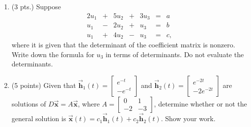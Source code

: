 \documentclass[12pt]{article}
\def\vh{\vec {\mathbf{h}}}
\def\vx{\vec {\mathbf{x}}}
\begin{document}
\begin{enumerate}
\begin{enumerate}
  \vfill
 

\item (3 pts.) Suppose
  \begin{equation*}
          \begin{array}{rrrrrrl}
              2 u_1&+& 5 u_2&+& 3 u_3&= & a\\
               u_1& -&2 u_2& +& u_3& = & b\\
               u_1& +&4 u_2& - & u_3 & = & c,
          \end{array}
          \end{equation*}
          where it is given that the determinant of the coefficient matrix is nonzero.
          Write down the formula for $u_3$ in terms of determinants.
          Do not evaluate the determinants.

\vfill
    

 

\item (5 points) Given that $\vh_1(t) = \left[
            \begin{array}{r}
              e^{-t}  \\
              -e^{-t} 
            \end{array}
          \right]$  and $\vh_2(t) =\left[
            \begin{array}{r}
              e^{-2t}  \\
              -2e^{-2t} 
            \end{array}
          \right]$ are solutions of $D\vx = A\vx$, where $A = \left[
            \begin{array}{rr}
              0 & 1  \\
              -2 & -3 
            \end{array}
          \right]$, determine whether or not the general solution is
          $\vx(t) = c_1\vh_1(t) + c_2 \vh_2(t)$.
          Show your work.
       \end{enumerate} 
        
          \vfill
          

        

\end{enumerate}
\end{document}
